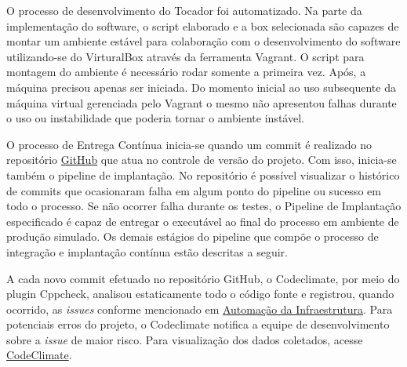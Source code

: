 

O processo de desenvolvimento do Tocador foi automatizado. Na parte da implementação do software, o script elaborado e a box selecionada são capazes de montar um ambiente estável para colaboração com o desenvolvimento do software utilizando-se do VirturalBox através da ferramenta Vagrant. O script para montagem do ambiente é necessário rodar somente a primeira vez. Após, a máquina precisou apenas ser iniciada. Do momento inicial ao uso subsequente da máquina virtual gerenciada pelo Vagrant o mesmo não apresentou falhas durante o uso ou instabilidade que poderia tornar o ambiente instável.


O processo de Entrega Contínua inicia-se quando um commit é realizado no repositório \href{https://github.com/BryanFernandes/player_rab-ogg}{GitHub} que atua no controle de versão do projeto. Com isso, inicia-se também o pipeline de implantação. No repositório é possível visualizar o histórico de commits que ocasionaram falha em algum ponto do pipeline ou sucesso em todo o processo. Se não ocorrer falha durante os testes, o Pipeline de Implantação especificado é capaz de entregar o executável ao final do processo em ambiente de produção simulado. Os demais estágios do pipeline que compõe o processo de integração e implantação contínua estão descritas a seguir.

A cada novo commit efetuado no repositório GitHub, o Codeclimate, por meio do plugin Cppcheck, analisou estaticamente todo o código fonte e registrou, quando ocorrido, as \textit{issues} conforme mencionado em \hyperref[analiseestatica]{Automação da Infraestrutura}. Para potenciais erros do projeto, o Codeclimate notifica a equipe de desenvolvimento sobre a \textit{issue} de maior risco. Para visualização dos dados coletados, acesse \href{https://codeclimate.com/github/BryanFernandes/player_rab-ogg}{CodeClimate}.

